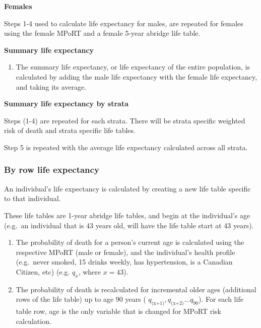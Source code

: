 \documentclass[]{book}
\providecommand{\tightlist}{%
  \setlength{\itemsep}{0pt}\setlength{\parskip}{0pt}}
\begin{document}
\textbf{Females}

Steps 1-4 used to calculate life expectancy for males, are repeated for females using the female MPoRT and a female 5-year abridge life table.

\textbf{Summary life expectancy}

\begin{enumerate}
\def\labelenumi{\arabic{enumi}.}
\setcounter{enumi}{4}
\tightlist
\item
  The summary life expectancy, or life expectancy of the entire population, is calculated by adding the male life expectancy with the female life expectancy, and taking its average.
\end{enumerate}

\textbf{Summary life expectancy by strata}

Steps (1-4) are repeated for each strata. There will be strata specific weighted risk of death and strata specific life tables.

Step 5 is repeated with the average life expectancy calculated across all strata.

\hypertarget{by-row-life-expectancy}{%
\subsubsection{By row life expectancy}\label{by-row-life-expectancy}}

An individual's life expectancy is calculated by creating a new life table specific to that individual.

These life tables are 1-year abridge life tables, and begin at the individual's age (e.g.~an individual that is 43 years old, will have the life table start at 43 years).

\begin{enumerate}
\def\labelenumi{\arabic{enumi}.}
\item
  The probability of death for a person's current age is calculated using the respective MPoRT (male or female), and the individual's health profile (e.g.~never smoked, 15 drinks weekly, has hypertension, is a Canadian Citizen, etc) (e.g. \(q_x\), where \(x=43\)).
\item
  The probability of death is recalculated for incremental older ages (additional rows of the life table) up to age 90 years ( \(q_\text{(x+1)}, q_\text{(x+2)}...q_{90}\)). For each life table row, age is the only variable that is changed for MPoRT risk calculation.
\end{enumerate}
\end{document}
